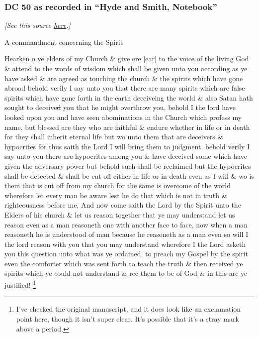 				
			\subsubsection{DC 50 as recorded in ``Hyde and Smith, Notebook''}
				\label{EXSS-DC50-EARLY-NOTEBOOK}
				
				\textit{[See this source \href{https://www.josephsmithpapers.org/paper-summary/revelation-9-may-1831-as-recorded-in-hyde-and-smith-notebook-dc-50/1}{here}.]}
				
				A commandment concerning the Spirit

				Hearken o ye elders of my Church \& give ere [ear] to the voice of the living God \& attend to the words of wisdom which shall be given unto you according as ye have asked \& are agreed as touching the church \& the spirits which have gone abroad behold verily I say unto you that there are many spirits which are false spirits which have gone forth in the earth deceiveing the world \& also Satan hath sought to deceive\sout{d} you that he might overthrow you, behold I the lord have looked upon you and have seen abominations in the Church which profess my name, but blessed are they who are faithful \& endure whether in life or in death for they shall inherit eternal life but wo unto them that are deceivers \& hypocrites for thus saith the Lord I will bring them to judgment, behold verily I say unto you there are hypocrites among you \& have deceived some which have given the adversary power but behold such shall be reclaimed but the hypocrites shall be detected \& shall be cut off either in life or in death even as I will \& wo is them that is cut off from my church for the same is overcome of the world wherefore let every man be aware lest he do that which is not in truth \& righteousness before me, And now come saith the Lord by the Spirit unto the Elders of his church \& let us reason together that ye may understand let us reason even as a man reasoneth one with another face to face, now when a man reasoneth he is understood of man because he reasoneth as a man even so will I the lord reason with you that you may understand wherefore I the Lord asketh you this question unto what was ye ordained, to preach my Gospel by the spirit even the comforter which was sent forth to teach the truth \& then received ye spirits which ye could not understand \& rec them to be of God \& in this are ye justified!%
					\footnote{%
						I've checked the original manuscript, and it does look like an exclamation point here, though it isn't super clear. It's possible that it's a stray mark above a period.
						}
